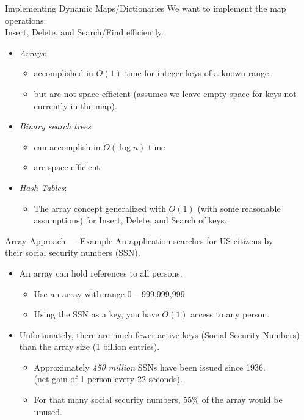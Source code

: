 \documentclass[14pt,aspectratio=1610]{beamer}
\begin{document}
\begin{frame}{Implementing Dynamic Maps/Dictionaries}
We want to implement the map operations:\\
Insert, Delete, and Search/Find efficiently.

\begin{itemize}
\item<2->
  \emph{Arrays}:
  \begin{itemize}
  \item
    accomplished in \(O(1)\) time for integer keys of a known range.
  \item
    but are not space efficient (assumes we leave empty space for keys not currently in the map).
  \end{itemize}
\item<3->
  \emph{Binary search trees}:
  \begin{itemize}
  \item
    can accomplish in \(O(\log n)\) time
  \item
    are space efficient.
  \end{itemize}
\item<4->
  \emph{Hash Tables}:
  \begin{itemize}
  \item
    The array concept generalized with \(O(1)\) (with some reasonable assumptions) for Insert, Delete, and Search of keys.
  \end{itemize}
\end{itemize}
\end{frame}

\begin{frame}{Array Approach --- Example}
An application searches for US citizens by\\
their social security numbers (SSN).
\begin{itemize}
\item<2->
  An array can hold references to all persons.
  \begin{itemize}
  \item
    Use an array with range 0 -- 999,999,999
  \item
    Using the SSN as a key, you have \(O(1)\) access to any person.
  \end{itemize}
\item<3->
  Unfortunately, there are much fewer active keys (Social Security Numbers) than the array size (1 billion entries).
  \begin{itemize}
  \item
    Approximately \emph{450 million} SSNs have been issued since 1936.\\
    (net gain of 1 person every 22 seconds).
  \item
    For that many social security numbers, 55\% of the array would be unused.
  \end{itemize}
\end{itemize}
\end{frame}
\end{document}
